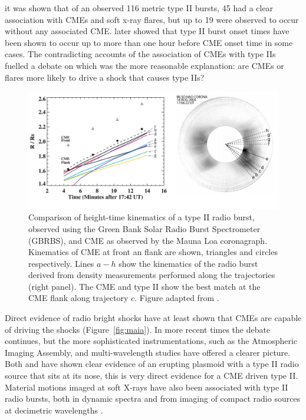 it was shown that of an observed 116 metric type II bursts, 45 had a clear association with CMEs and soft x-ray flares, but up to 19 were observed to occur without any associated CME. \citet{classen2002} later showed that type II burst onset times have been shown to occur up to more than one hour before CME onset time in some cases. The contradicting accounts of the association of CMEs with type IIs fuelled a debate on which was the more reasonable explanation: are CMEs or flares more likely to drive a shock that causes type IIs?  
\begin{figure}[t!]
\begin{center}
\includegraphics[scale=0.27, trim=0cm 1cm 0cm 1cm]{images/cho_trim.png}
\caption[Comparison of CME and type II height-time kinematics]{Comparison of height-time kinematics of a type II radio burst, observed using the Green Bank Solar Radio Burst Spectrometer (GBRBS), and CME as observed by the Mauna Loa coronagraph. Kinematics of CME at front an flank are shown, triangles and circles respectively.
Lines $a-h$ show the kinematics of the radio burst derived from density measurements performed along the trajectories (right panel). The CME and type II show the best match at the CME flank along trajectory $c$. Figure adapted from \citet{cho2007}.}
\label{fig:cho}
\end{center}
\end{figure}

Direct evidence of radio bright shocks have at least shown that CMEs are capable of driving the shocks \citep{maia2000} (Figure~\ref{fig:maia}).
In more recent times the debate continues, but the more sophisticated instrumentations, such as the Atmospheric Imaging Assembly, and multi-wavelength studies have offered a clearer picture. Both \citet{bain2012} {\color{blue} and \citet{zimovets2012}} have shown clear evidence of an erupting plasmoid with a type II radio source that sits at its nose, this is very direct evidence for a CME driven type II. {\color{blue} Material motions imaged at soft X-rays have also been associated with type II radio bursts, both in dynamic spectra and from imaging of compact radio sources at decimetric wavelengths \citep{klein1999, dauphin2006}.}


